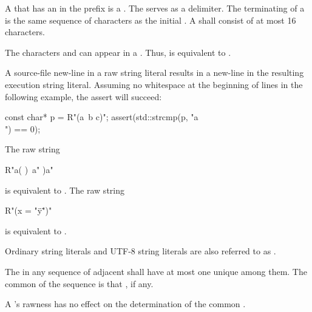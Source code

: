 \pnum
{}%
A  that has an 
%
in the prefix is a . The
 serves as a delimiter. The terminating
 of a  is the same sequence of
characters as the initial . A 
shall consist of at most 16 characters.

\pnum
\begin{note}
The characters  and  can appear in a
. Thus,  is equivalent to
.
\end{note}

\pnum
\begin{note}
A source-file new-line in a raw string literal results in a new-line in the
resulting execution string literal. Assuming no
whitespace at the beginning of lines in the following example, the assert will succeed:
\begin{codeblock}
const char* p = R"(a\
b
c)";
assert(std::strcmp(p, "a\\\nb\nc") == 0);
\end{codeblock}
\end{note}

\pnum
\begin{example}
The raw string
\begin{codeblock}
R"a(
)\
a"
)a"
\end{codeblock}
is equivalent to . The raw string
\begin{codeblock}
R"(x = "\"y\"")"
\end{codeblock}
is equivalent to .
\end{example}

\pnum
{}%
Ordinary string literals and UTF-8 string literals are
also referred to as .

\pnum
{}%
The  in
any sequence of adjacent 
shall have at most one unique  among them.
The common \grammarterm{encoding-prefix} of the sequence is
that \grammarterm{encoding-prefix}, if any.
\begin{note}
A 's rawness has
no effect on the determination of the common .
\end{note}

